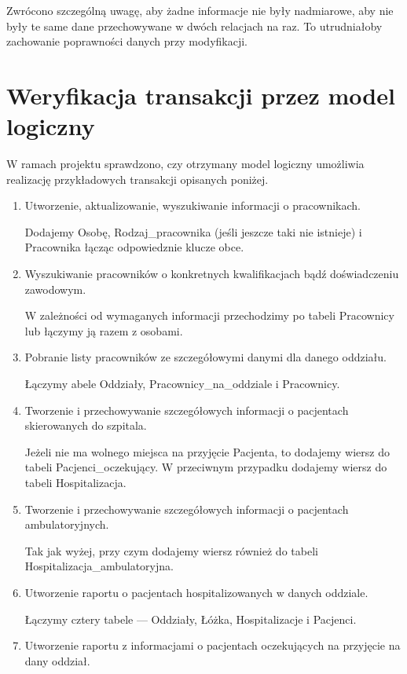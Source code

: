 Zwrócono szczególną uwagę, aby żadne informacje nie były nadmiarowe, aby nie były te same dane przechowywane w dwóch relacjach na raz. To utrudniałoby zachowanie poprawności danych przy modyfikacji.

\section{Weryfikacja transakcji przez model logiczny}
W ramach projektu sprawdzono, czy otrzymany model logiczny umożliwia realizację przykładowych transakcji opisanych poniżej.

\begin{enumerate}


\item Utworzenie, aktualizowanie, wyszukiwanie informacji o pracownikach.

Dodajemy Osobę, Rodzaj\_pracownika (jeśli jeszcze taki nie istnieje) i Pracownika łącząc odpowiedznie klucze obce.

\item Wyszukiwanie pracowników o konkretnych kwalifikacjach bądź doświadczeniu zawodowym.

W zależności od wymaganych informacji przechodzimy po tabeli Pracownicy lub łączymy ją razem z osobami.

\item Pobranie listy pracowników ze szczegółowymi danymi dla danego oddziału.

Łączymy abele Oddziały, Pracownicy\_na\_oddziale i Pracownicy.

\item Tworzenie i przechowywanie szczegółowych informacji o pacjentach  skierowanych do szpitala.

Jeżeli nie ma wolnego miejsca na przyjęcie Pacjenta, to dodajemy wiersz do tabeli Pacjenci\_oczekujący. W przeciwnym przypadku dodajemy wiersz do tabeli Hospitalizacja.

\item Tworzenie i przechowywanie szczegółowych informacji o pacjentach ambulatoryjnych.

Tak jak wyżej, przy czym dodajemy wiersz również do tabeli Hospitalizacja\_ambulatoryjna.

\item Utworzenie raportu o pacjentach hospitalizowanych w danych oddziale.

Łączymy cztery tabele --- Oddziały, Łóżka, Hospitalizacje i Pacjenci.

\item Utworzenie raportu z informacjami o pacjentach oczekujących na przyjęcie na dany oddział.


\end{enumerate}
